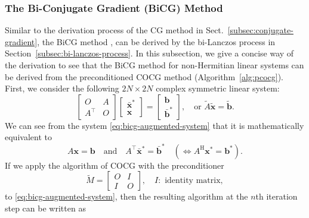 \subsubsection{{The Bi-Conjugate Gradient (BiCG) Method}}\label{subsec:bicg-method}
{Similar to the derivation process of the CG method in Sect.\ \ref{subsec:conjugate-gradient}, the BiCG method ,  can be derived by the bi-Lanczos process in Section\ \ref{subsec:bi-lanczos-process}.}
{In this subsection, we give a concise way of the derivation to see that the BiCG method for non-Hermitian linear systems can be derived from the preconditioned COCG method (Algorithm\ \ref{alg:pcocg}). First, we consider the following $2N\times2N$ complex symmetric linear system:}
\begin{equation}\label{eq:bicg-augmented-system}
\begin{bmatrix}O&A\\A^{\top}&O\end{bmatrix}\begin{bmatrix}\bar{\bm x}^{*}\\\bm x\end{bmatrix}=\begin{bmatrix}\bm b\\\bar{\bm b}^{*}\end{bmatrix},\quad\text{or }\widetilde A\widetilde{\bm x}=\widetilde{\bm b}.
\end{equation}
{We can see from the system \eqref{eq:bicg-augmented-system} that it is mathematically equivalent to}
\[A\bm x=\bm b\quad\text{and}\quad A^{\top}\bar{\bm x}^{*}=\bar{\bm b}^{*}\quad(\Leftrightarrow A^{\mathrm H}\bm x^{*}=\bm b^{*}).\]
{If we apply the algorithm of COCG with the preconditioner}
\begin{equation}\label{eq:bicg-swap-preconditioner}\widetilde M=\begin{bmatrix}O&I\\I&O\end{bmatrix},\quad I:\text{ identity matrix},\end{equation}
{to \eqref{eq:bicg-augmented-system}, then the resulting algorithm at the $n$th iteration step can be written as}
